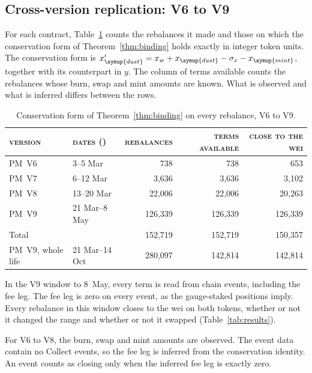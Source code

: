 \documentclass[11pt,a4paper]{article}
\DeclareRobustCommand{\scn}[1]{{\upshape\addfontfeatures{Numbers={Lining,Proportional}}\scalebox{0.84}{#1}}}
\DeclareRobustCommand{\thd}[1]{{\scshape\addfontfeatures{LetterSpace=1.5}\MakeLowercase{#1}}}
\DeclareRobustCommand{\acr}[1]{{\addfontfeatures{Letters=UppercaseSmallCaps,LetterSpace=2}#1}}
\theoremstyle{siphon}
\begin{document}
\subsection{Cross-version replication: V6 to V9}\label{sec:cross_version}

For each contract, Table~\ref{tab:cross_version} counts the rebalances it made and those on which the conservation form of Theorem~\ref{thm:binding} holds exactly in integer token units. The conservation form is $x_{\symup{dust}}' = x_w + x_{\symup{dust}} - \sigma_x - x_{\symup{mint}}$, together with its counterpart in $y$. The column of terms available counts the rebalances whose burn, swap and mint amounts are known. What is observed and what is inferred differs between the rows.

\begin{table}[!htb]
\centering
\caption{Conservation form of Theorem~\ref{thm:binding} on every rebalance, V6 to V9.}
\label{tab:cross_version}
\begin{tabular}{@{}llrrr@{}}
\toprule
\thd{Version} & \thd{Dates (}\scn{2026}\thd{)} & \thd{Rebalances} & \thd{Terms available} & \thd{Close to the wei}  \\
\midrule
\acr{PM}~V6 & 3--5 Mar & 738 & 738 & 653 \\
\acr{PM}~V7 & 6--12 Mar & 3{,}636 & 3{,}636 & 3{,}102 \\
\acr{PM}~V8 & 13--20 Mar & 22{,}006 & 22{,}006 & 20{,}263 \\
\acr{PM}~V9 & 21 Mar--8 May & 126{,}339 & 126{,}339 & 126{,}339 \\
\midrule
Total & & 152{,}719 & 152{,}719 & 150{,}357 \\
\midrule
\acr{PM}~V9, whole life & 21 Mar--14 Oct & 280{,}097 & 142{,}814 & 142{,}814 \\
\bottomrule
\end{tabular}
\end{table}

In the V9 window to 8~May, every term is read from chain events, including the fee leg. The fee leg is zero on every event, as the gauge-staked positions imply. Every rebalance in this window closes to the wei on both tokens, whether or not it changed the range and whether or not it swapped (Table~\ref{tab:results}).

For V6 to V8, the burn, swap and mint amounts are observed. The event data contain no Collect events, so the fee leg is inferred from the conservation identity. An event counts as closing only when the inferred fee leg is exactly zero.
\end{document}

